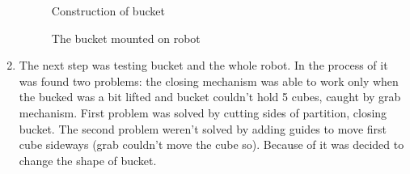 \begin{enumerate}
 \begin{figure}[H]
  \begin{minipage}[h]{0.49\linewidth}
  	\caption{Construction of bucket}
  \end{minipage}
  \begin{minipage}[h]{0.49\linewidth}
  	\caption{The bucket mounted on robot}
  \end{minipage}
 \end{figure}
  
  \item The next step was testing bucket and the whole robot. In the process of it was found two problems: the closing mechanism was able to work only when the bucked was a bit lifted and bucket couldn't hold 5 cubes, caught by grab mechanism. First problem was solved by cutting sides of partition, closing bucket. The second problem weren't solved by adding guides to move first cube sideways (grab couldn't move the cube so). Because of it was decided to change the shape of bucket. 
  

\end{enumerate}
